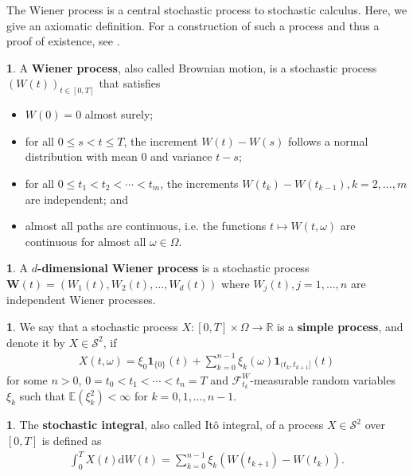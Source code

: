 \documentclass[english]{article}
\numberwithin{equation}{section}
\numberwithin{figure}{section}
\theoremstyle{bolddescit}
\theoremstyle{definition}
\newtheorem{definition}[theorem]{\protect\definitionname}
\theoremstyle{definition}
\theoremstyle{plain}
\theoremstyle{plain}
\theoremstyle{bolddesc}
\theoremstyle{plain}
\theoremstyle{remark}
\providecommand{\definitionname}{Definition}
\begin{document}
The Wiener process is a central stochastic process to stochastic calculus. Here, we give an axiomatic definition. For a construction of such a process and thus a proof of existence, see \textcite{capinski_stochastic_2012}.

\begin{definition}
  A \textbf{Wiener process}, also called Brownian motion, is a stochastic process $(W(t))_{t \in [0,T]}$ that satisfies
  \begin{itemize}
    \item $W(0) = 0$ almost surely;
    \item for all $0 \le s < t \le T$, the increment $W(t) - W(s)$ follows a normal distribution with mean 0 and variance $t - s$;
    \item for all $0 \le t_1 < t_2 < \cdots < t_m$, the increments $W(t_k) - W(t_{k-1}), k=2,\ldots,m$ are independent; and
    \item almost all paths are continuous, i.e. the functions $t \mapsto W(t,\omega)$ are continuous for almost all $\omega \in \Omega$.
  \end{itemize}
\end{definition}

\begin{definition}
  A \textbf{$d$-dimensional Wiener process} is a stochastic process $\mathbf{W}(t) = (W_1(t), W_2(t), \ldots, W_d(t))$ where $W_j(t), j=1,\ldots,n$ are independent Wiener processes.
\end{definition}

\begin{definition}
  We say that a stochastic process $X : [0,T] \times \Omega \to \mathbb{R}$ is a \textbf{simple process}, and denote it by $X \in \mathcal{S}^2$, if
  \begin{align*}
    X(t,\omega) = \xi_0 \mathbf{1}_{\{0\}}(t) + \sum_{k=0}^{n-1} \xi_k(\omega) \mathbf{1}_{(t_k,t_{k+1}]}(t)
  \end{align*}
  for some $n > 0$, $0 = t_0 < t_1 < \cdots < t_n = T$ and $\mathcal{F}^W_{t_k}$-measurable random variables $\xi_k$ such that $\mathbb{E}(\xi_k^2) < \infty$ for $k = 0,1,\ldots,n-1$.
\end{definition}

\begin{definition}
  The \textbf{stochastic integral}, also called It\^o integral, of a process $X \in \mathcal{S}^2$ over $[0,T]$ is defined as
  \begin{align*}
    \int_0^T X(t) \mathrm{d}W(t) = \sum_{k=0}^{n-1} \xi_k (W(t_{k+1}) - W(t_k)).
  \end{align*}
\end{definition}
\end{document}
